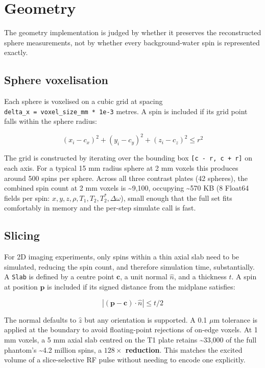 \hypertarget{geometry}{%
\section{Geometry}\label{geometry}}

The geometry implementation is judged by whether it preserves the
reconstructed sphere measurements, not by whether every background-water
spin is represented exactly.

\hypertarget{sphere-voxelisation}{%
\subsection{Sphere voxelisation}\label{sphere-voxelisation}}

Each sphere is voxelised on a cubic grid at spacing
\texttt{delta\_x\ =\ voxel\_size\_mm\ *\ 1e-3} metres. A spin is
included if its grid point falls within the sphere radius:

\[
(x_i - c_x)^2 + (y_i - c_y)^2 + (z_i - c_z)^2 \leq r^2
\]

The grid is constructed by iterating over the bounding box
\texttt{{[}c\ -\ r,\ c\ +\ r{]}} on each axis. For a typical 15 mm
radius sphere at 2 mm voxels this produces around 500 spins per sphere.
Across all three contrast plates (42 spheres), the combined spin count
at 2 mm voxels is \textasciitilde9,100, occupying \textasciitilde570 KB
(8 Float64 fields per spin:
\(x, y, z, \rho, T_1, T_2, T_2^*, \Delta\omega\)), small enough that the
full set fits comfortably in memory and the per-step simulate call is
fast.

\hypertarget{slicing}{%
\subsection{Slicing}\label{slicing}}

For 2D imaging experiments, only spins within a thin axial slab need to
be simulated, reducing the spin count, and therefore simulation time,
substantially. A \texttt{Slab} is defined by a centre point
\(\mathbf{c}\), a unit normal \(\hat{n}\), and a thickness \(t\). A spin
at position \(\mathbf{p}\) is included if its signed distance from the
midplane satisfies:

\[
|(\mathbf{p} - \mathbf{c}) \cdot \hat{n}| \leq t/2
\]

The normal defaults to \(\hat{z}\) but any orientation is supported. A
0.1 \(\mu\)m tolerance is applied at the boundary to avoid floating-point
rejections of on-edge voxels. At 1 mm voxels, a 5 mm axial slab centred
on the T1 plate retains \textasciitilde33,000 of the full phantom's
\textasciitilde4.2 million spins, a \textbf{\(128\times\) reduction}. This
matches the excited volume of a slice-selective RF pulse without needing
to encode one explicitly.

